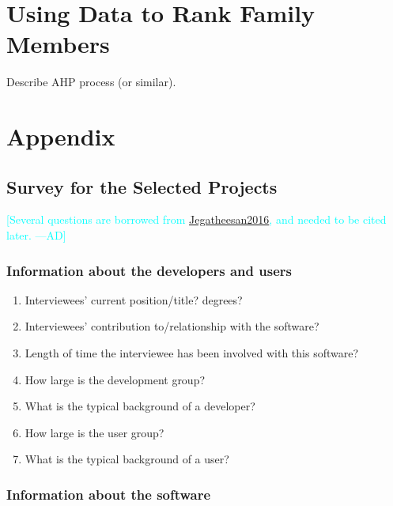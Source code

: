 \documentclass[letterpaper,cleveref]{lipics-v2019}
\newcommand{\authornote}[3]{\textcolor{#1}{[#3 ---#2]}}
\newcommand{\authornote}[3]{}
\newcommand{\ad}[1]{\authornote{cyan}{AD}{#1}} %
\theoremstyle{definition}
\begin{document}
\section{Using Data to Rank Family Members}

Describe AHP process (or similar).

\appendix
\section{Appendix}
\subsection{Survey for the Selected Projects}
\ad{Several questions are borrowed from \href{https://gitlab.cas.mcmaster.ca/smiths/pub/-/blob/master/Jegatheesan2016.pdf}{Jegatheesan2016}, and needed to be cited later.}
\subsubsection{Information about the developers and users}
\begin{enumerate}
\item Interviewees' current position/title? degrees?
\item Interviewees' contribution to/relationship with the software?
\item Length of time the interviewee has been involved with this software?
\item How large is the development group?
\item What is the typical background of a developer?
\item How large is the user group?
\item What is the typical background of a user?
\end{enumerate}

\subsubsection{Information about the software}
\end{document}
